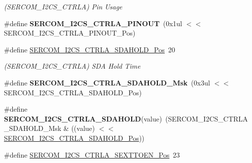 \begin{DoxyCompactItemize}
\begin{DoxyCompactList}\small\item\em (S\+E\+R\+C\+O\+M\+\_\+\+I2\+C\+S\+\_\+\+C\+T\+R\+L\+A) Pin Usage \end{DoxyCompactList}\item 
\hypertarget{group___s_a_m_l21___s_e_r_c_o_m_gadb131d9dcc9294a123114111a07f1b27}{}\#define {\bfseries S\+E\+R\+C\+O\+M\+\_\+\+I2\+C\+S\+\_\+\+C\+T\+R\+L\+A\+\_\+\+P\+I\+N\+O\+U\+T}~(0x1ul $<$$<$ S\+E\+R\+C\+O\+M\+\_\+\+I2\+C\+S\+\_\+\+C\+T\+R\+L\+A\+\_\+\+P\+I\+N\+O\+U\+T\+\_\+\+Pos)\label{group___s_a_m_l21___s_e_r_c_o_m_gadb131d9dcc9294a123114111a07f1b27}

\item 
\hypertarget{group___s_a_m_l21___s_e_r_c_o_m_ga5170f9bf6f5f520e15ef8fc791431dff}{}\#define \hyperlink{group___s_a_m_l21___s_e_r_c_o_m_ga5170f9bf6f5f520e15ef8fc791431dff}{S\+E\+R\+C\+O\+M\+\_\+\+I2\+C\+S\+\_\+\+C\+T\+R\+L\+A\+\_\+\+S\+D\+A\+H\+O\+L\+D\+\_\+\+Pos}~20\label{group___s_a_m_l21___s_e_r_c_o_m_ga5170f9bf6f5f520e15ef8fc791431dff}

\begin{DoxyCompactList}\small\item\em (S\+E\+R\+C\+O\+M\+\_\+\+I2\+C\+S\+\_\+\+C\+T\+R\+L\+A) S\+D\+A Hold Time \end{DoxyCompactList}\item 
\hypertarget{group___s_a_m_l21___s_e_r_c_o_m_gaf872a38304cfa9a5fa4197ebec52e920}{}\#define {\bfseries S\+E\+R\+C\+O\+M\+\_\+\+I2\+C\+S\+\_\+\+C\+T\+R\+L\+A\+\_\+\+S\+D\+A\+H\+O\+L\+D\+\_\+\+Msk}~(0x3ul $<$$<$ S\+E\+R\+C\+O\+M\+\_\+\+I2\+C\+S\+\_\+\+C\+T\+R\+L\+A\+\_\+\+S\+D\+A\+H\+O\+L\+D\+\_\+\+Pos)\label{group___s_a_m_l21___s_e_r_c_o_m_gaf872a38304cfa9a5fa4197ebec52e920}

\item 
\hypertarget{group___s_a_m_l21___s_e_r_c_o_m_ga799ec52923ecad4b47caed3ec8d741da}{}\#define {\bfseries S\+E\+R\+C\+O\+M\+\_\+\+I2\+C\+S\+\_\+\+C\+T\+R\+L\+A\+\_\+\+S\+D\+A\+H\+O\+L\+D}(value)~(S\+E\+R\+C\+O\+M\+\_\+\+I2\+C\+S\+\_\+\+C\+T\+R\+L\+A\+\_\+\+S\+D\+A\+H\+O\+L\+D\+\_\+\+Msk \& ((value) $<$$<$ \hyperlink{group___s_a_m_l21___s_e_r_c_o_m_ga5170f9bf6f5f520e15ef8fc791431dff}{S\+E\+R\+C\+O\+M\+\_\+\+I2\+C\+S\+\_\+\+C\+T\+R\+L\+A\+\_\+\+S\+D\+A\+H\+O\+L\+D\+\_\+\+Pos}))\label{group___s_a_m_l21___s_e_r_c_o_m_ga799ec52923ecad4b47caed3ec8d741da}

\item 
\hypertarget{group___s_a_m_l21___s_e_r_c_o_m_gadeb7a22a380654bdbc0ba717bf7a8789}{}\#define \hyperlink{group___s_a_m_l21___s_e_r_c_o_m_gadeb7a22a380654bdbc0ba717bf7a8789}{S\+E\+R\+C\+O\+M\+\_\+\+I2\+C\+S\+\_\+\+C\+T\+R\+L\+A\+\_\+\+S\+E\+X\+T\+T\+O\+E\+N\+\_\+\+Pos}~23\label{group___s_a_m_l21___s_e_r_c_o_m_gadeb7a22a380654bdbc0ba717bf7a8789}


\end{DoxyCompactItemize}
